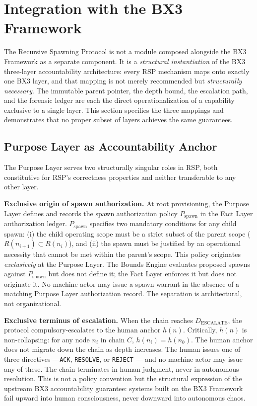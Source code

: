 \section{Integration with the BX3 Framework}
\label{sec:rs-integration}

The Recursive Spawning Protocol is not a module composed alongside the BX3 Framework as a separate component. It is a \textit{structural instantiation} of the BX3 three-layer accountability architecture: every RSP mechanism maps onto exactly one BX3 layer, and that mapping is not merely recommended but \textit{structurally necessary}. The immutable parent pointer, the depth bound, the escalation path, and the forensic ledger are each the direct operationalization of a capability exclusive to a single layer. This section specifies the three mappings and demonstrates that no proper subset of layers achieves the same guarantees.

\subsection{Purpose Layer as Accountability Anchor}
\label{sec:rs-purpose-anchor}

The Purpose Layer serves two structurally singular roles in RSP, both constitutive for RSP's correctness properties and neither transferable to any other layer.

\medskip
\noindent\textbf{Exclusive origin of spawn authorization.} At root provisioning, the Purpose Layer defines and records the spawn authorization policy $P_{\mathrm{spawn}}$ in the Fact Layer authorization ledger. $P_{\mathrm{spawn}}$ specifies two mandatory conditions for any child spawn: (i) the child operating scope must be a strict subset of the parent scope ($R(n_{i+1}) \subset R(n_i)$), and (ii) the spawn must be justified by an operational necessity that cannot be met within the parent's scope. This policy originates \emph{exclusively} at the Purpose Layer. The Bounds Engine evaluates proposed spawns against $P_{\mathrm{spawn}}$ but does not define it; the Fact Layer enforces it but does not originate it. No machine actor may issue a spawn warrant in the absence of a matching Purpose Layer authorization record. The separation is architectural, not organizational.

\medskip
\noindent\textbf{Exclusive terminus of escalation.} When the chain reaches $D_{\mathrm{ESCALATE}}$, the protocol compulsory-escalates to the human anchor $h(n)$. Critically, $h(n)$ is non-collapsing: for any node $n_i$ in chain $C$, $h(n_i) = h(n_0)$. The human anchor does not migrate down the chain as depth increases. The human issues one of three directives ---\texttt{ACK}, \texttt{RESOLVE}, or \texttt{REJECT} --- and no machine actor may issue any of these. The chain terminates in human judgment, never in autonomous resolution. This is not a policy convention but the structural expression of the upstream BX3 accountability guarantee: systems built on the BX3 Framework fail upward into human consciousness, never downward into autonomous chaos.


